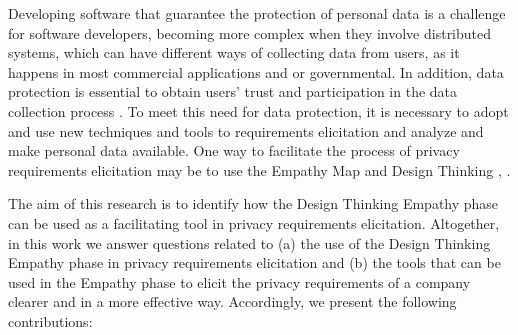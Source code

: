\documentclass[conference]{IEEEtran}
\begin{document}
Developing software that guarantee the protection of personal data is a challenge for software developers, becoming more complex when they involve distributed systems, which can have different ways of collecting data from users, as it happens in most commercial applications and or governmental. In addition, data protection is essential to obtain users' trust and participation in the data collection process \cite{DBLP:journals/access/BinjubeirAISK20}. To meet this need for data protection, it is necessary to adopt and use new techniques and tools to requirements elicitation and analyze and make personal data available. One way to facilitate the process of privacy requirements elicitation may be to use the Empathy Map \cite{DBLP:conf/sbes/FerreiraCB15} and Design Thinking \cite{DBLP:books/lib/brown2009change}, \cite{DBLP:conf/hci/CanedoC18}.


The aim of this research is to identify how the Design Thinking Empathy phase can be used as a facilitating tool in privacy requirements elicitation. Altogether, in this work we answer questions related to (a) the use of the Design Thinking Empathy phase in privacy requirements elicitation and (b) the tools that can be used in the Empathy phase to elicit the privacy requirements of a company clearer and in a more effective way. Accordingly, we present the following contributions:
\end{document}
